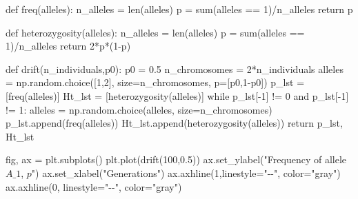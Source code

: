 \documentclass[
  letterpaper,
  DIV=11,
  numbers=noendperiod]{scrartcl}
\newenvironment{Shaded}{\begin{snugshade}}{\end{snugshade}}
\newcommand{\BuiltInTok}[1]{\textcolor[rgb]{0.00,0.23,0.31}{#1}}
\newcommand{\ControlFlowTok}[1]{\textcolor[rgb]{0.00,0.23,0.31}{#1}}
\newcommand{\DecValTok}[1]{\textcolor[rgb]{0.68,0.00,0.00}{#1}}
\newcommand{\FloatTok}[1]{\textcolor[rgb]{0.68,0.00,0.00}{#1}}
\newcommand{\KeywordTok}[1]{\textcolor[rgb]{0.00,0.23,0.31}{#1}}
\newcommand{\NormalTok}[1]{\textcolor[rgb]{0.00,0.23,0.31}{#1}}
\newcommand{\OperatorTok}[1]{\textcolor[rgb]{0.37,0.37,0.37}{#1}}
\newcommand{\StringTok}[1]{\textcolor[rgb]{0.13,0.47,0.30}{#1}}
\begin{document}
\begin{Shaded}
\begin{Highlighting}[]
\KeywordTok{def}\NormalTok{ freq(alleles):}
\NormalTok{    n\_alleles }\OperatorTok{=} \BuiltInTok{len}\NormalTok{(alleles)}
\NormalTok{    p }\OperatorTok{=} \BuiltInTok{sum}\NormalTok{(alleles }\OperatorTok{==} \DecValTok{1}\NormalTok{)}\OperatorTok{/}\NormalTok{n\_alleles}
    \ControlFlowTok{return}\NormalTok{ p}

\KeywordTok{def}\NormalTok{ heterozygosity(alleles):}
\NormalTok{    n\_alleles }\OperatorTok{=} \BuiltInTok{len}\NormalTok{(alleles)}
\NormalTok{    p }\OperatorTok{=} \BuiltInTok{sum}\NormalTok{(alleles }\OperatorTok{==} \DecValTok{1}\NormalTok{)}\OperatorTok{/}\NormalTok{n\_alleles}
    \ControlFlowTok{return} \DecValTok{2}\OperatorTok{*}\NormalTok{p}\OperatorTok{*}\NormalTok{(}\DecValTok{1}\OperatorTok{{-}}\NormalTok{p)}

\KeywordTok{def}\NormalTok{ drift(n\_individuals,p0):}
\NormalTok{    p0 }\OperatorTok{=} \FloatTok{0.5}
\NormalTok{    n\_chromosomes }\OperatorTok{=} \DecValTok{2}\OperatorTok{*}\NormalTok{n\_individuals}
\NormalTok{    alleles }\OperatorTok{=}\NormalTok{ np.random.choice([}\DecValTok{1}\NormalTok{,}\DecValTok{2}\NormalTok{],}
\NormalTok{                            size}\OperatorTok{=}\NormalTok{n\_chromosomes,}
\NormalTok{                            p}\OperatorTok{=}\NormalTok{[p0,}\DecValTok{1}\OperatorTok{{-}}\NormalTok{p0])}
\NormalTok{    p\_lst }\OperatorTok{=}\NormalTok{ [freq(alleles)]}
\NormalTok{    Ht\_lst }\OperatorTok{=}\NormalTok{ [heterozygosity(alleles)]}
    \ControlFlowTok{while}\NormalTok{ p\_lst[}\OperatorTok{{-}}\DecValTok{1}\NormalTok{] }\OperatorTok{!=} \DecValTok{0} \KeywordTok{and}\NormalTok{ p\_lst[}\OperatorTok{{-}}\DecValTok{1}\NormalTok{] }\OperatorTok{!=} \DecValTok{1}\NormalTok{:}
\NormalTok{        alleles }\OperatorTok{=}\NormalTok{ np.random.choice(alleles,}
\NormalTok{                        size}\OperatorTok{=}\NormalTok{n\_chromosomes)}
\NormalTok{        p\_lst.append(freq(alleles))}
\NormalTok{        Ht\_lst.append(heterozygosity(alleles))}
    \ControlFlowTok{return}\NormalTok{ p\_lst, Ht\_lst}
\end{Highlighting}
\end{Shaded}

\begin{Shaded}
\begin{Highlighting}[]
\NormalTok{fig, ax }\OperatorTok{=}\NormalTok{ plt.subplots()}
\NormalTok{plt.plot(drift(}\DecValTok{100}\NormalTok{,}\FloatTok{0.5}\NormalTok{))}
\NormalTok{ax.set\_ylabel(}\StringTok{"Frequency of allele $A\_1$, $p$"}\NormalTok{)}
\NormalTok{ax.set\_xlabel(}\StringTok{"Generations"}\NormalTok{)}
\NormalTok{ax.axhline(}\DecValTok{1}\NormalTok{,linestyle}\OperatorTok{=}\StringTok{"{-}{-}"}\NormalTok{, color}\OperatorTok{=}\StringTok{"gray"}\NormalTok{)}
\NormalTok{ax.axhline(}\DecValTok{0}\NormalTok{, linestyle}\OperatorTok{=}\StringTok{"{-}{-}"}\NormalTok{, color}\OperatorTok{=}\StringTok{"gray"}\NormalTok{)}
\end{Highlighting}
\end{Shaded}
\end{document}
